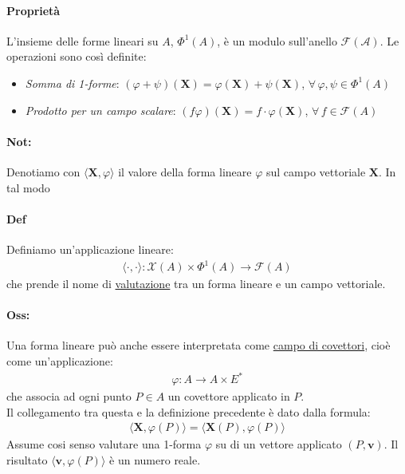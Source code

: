 \paragraph{Proprietà}L'insieme delle forme lineari su $A$, $\Phi^1(A)$, è un modulo sull'anello $\mathcal{F(A)}$. Le operazioni sono così definite:
\begin{itemize}
    \item \textit{Somma di 1-forme}: $(\varphi+ \psi)(\mathbf{X})=\varphi(\mathbf{X})+\psi(\mathbf{X})$, $\forall\, \varphi, \psi\in \Phi^1(A)$
    \item \textit{Prodotto per un campo scalare}: $(f\varphi)(\mathbf{X})=f\cdot \varphi(\mathbf{X})$, $\forall\, f \in \mathcal{F}(A)$
\end{itemize}
\paragraph{Not:} Denotiamo con $\langle \mathbf{X},\varphi\rangle $ il valore della forma lineare $\varphi$ sul campo vettoriale $\mathbf{X}$. In tal modo
\paragraph{Def} Definiamo un'applicazione lineare:
\begin{align*}
    \langle \cdot,\cdot\rangle  \colon \mathcal{X}(A)\times \Phi^1(A)\to \mathcal{F}(A)
\end{align*}
che prende il nome di \underline{valutazione} tra un forma lineare e un campo vettoriale.
\paragraph{Oss:} Una forma lineare può anche essere interpretata come \underline{campo di covettori}, cioè come un'applicazione:
\begin{align*}
    \varphi \colon A \to A \times E^*
\end{align*}
che associa ad ogni punto $P\in A$ un covettore applicato in $P$.\\
Il collegamento tra questa e la definizione precedente è dato dalla formula:
\begin{align*}
    \langle \mathbf{X},\varphi(P)\rangle =\langle \mathbf{X}(P),\varphi(P)\rangle 
\end{align*} 
Assume cosi senso valutare una 1-forma $\varphi$ su di un vettore applicato $(P,\mathbf{v})$. Il risultato $\langle \mathbf{v},\varphi(P)\rangle $ è un numero reale.
